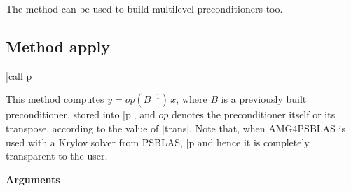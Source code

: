 \noindent
The method can be used to build multilevel preconditioners too.


\clearpage
\subsection{Method apply\label{sec:precapply}}

\begin{center}
\fortinline|call p%
\end{center}

\noindent
This method computes $y = op(B^{-1})\, x$, where $B$ is a previously built
preconditioner, stored into \fortinline|p|, and $op$
denotes the preconditioner itself or its transpose, according to
the value of \fortinline|trans|.
Note that, when AMG4PSBLAS is used with a Krylov solver from PSBLAS,
\fortinline|p%
and hence it is completely transparent to the user.

{\baselineskip\noindent\large\bfseries Arguments} \smallskip

